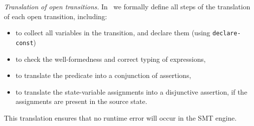 \documentclass[smallcondensed]{svjour3}
\newcommand{\TODO}[1]{\textcolor{red}{\textbf{[TODO:#1]}}}
\newcommand{\Post}{\symb{Post}}
\begin{document}



\emph{Translation of open transitions.}
In~\cite{Avocs-RR} we formally define all steps of the translation of each
open transition, including:
%
\begin{itemize}
	\item to collect all variables in the transition, and declare them (using \texttt{declare-const})
	\item to check the well-formedness and correct typing of expressions,
	\item to translate the predicate into a conjunction of assertions,
	\item to translate the state-variable
	assignments into a disjunctive assertion, if the assignments are present in the source state.
\end{itemize}
%
This translation ensures that no runtime error will occur
in the SMT engine.
\end{document}
